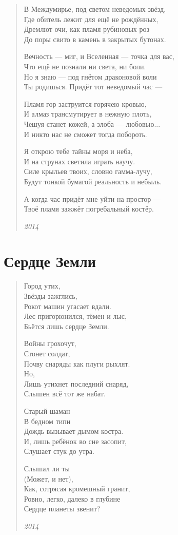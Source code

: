 \documentclass[a4paper,12pt,fleqn]{book}\usepackage{polyglossia}\setdefaultlanguage[babelshorthands=true]{russian}\setotherlanguage{english}\defaultfontfeatures{Ligatures=TeX,Mapping=tex-text}\usepackage{xcolor}\newcommand{\ml}[3]{#2}
\begin{document}
\begin{verse}
В Междумирье, под светом неведомых звёзд,\\
Где обитель лежит для ещё не рождённых,\\
Дремлют очи, как пламя рубиновых роз\\
До поры свито в камень в закрытых бутонах.

Вечность --- миг, и Вселенная --- точка для вас,\\
Что ещё не познали ни света, ни боли.\\
Но я знаю --- под гнётом драконовой воли\\
Ты родишься. Придёт тот неведомый час ---

Пламя гор заструится горячею кровью,\\
И алмаз трансмутирует в нежную плоть,\\
Чешуя станет кожей, а злоба --- любовью...\\
И никто нас не сможет тогда побороть.

Я открою тебе тайны моря и неба,\\
И на струнах светила играть научу.\\
Силе крыльев твоих, словно гамма-лучу,\\
Будут тонкой бумагой реальность и небыль.

А когда час придёт мне уйти на простор ---\\
Твоё пламя зажжёт погребальный костёр.

\emph{2014}
\end{verse}
\newpage

\section{Сердце Земли}

\begin{verse}
Город утих,\\
Звёзды зажглись,\\
Рокот машин угасает вдали.\\
Лес пригорюнился, тёмен и лыс,\\
Бьётся лишь сердце Земли.

Войны грохочут,\\
Стонет солдат,\\
Почву снаряды как плуги рыхлят.\\
Но,\\
Лишь утихнет последний снаряд,\\
Слышен всё тот же набат.

Старый шаман\\
В бедном типи\\
Дождь вызывает дымом костра.\\
И, лишь ребёнок во сне засопит,\\
Слушает стук до утра.

Слышал ли ты\\
(Может, и нет),\\
Как, сотрясая кромешный гранит,\\
Ровно, легко, далеко в глубине\\
Сердце планеты звенит?

\emph{2014}
\end{verse}
\newpage
\end{document}
